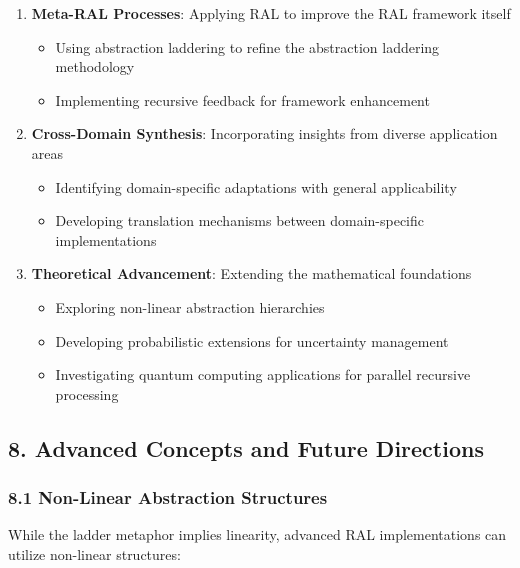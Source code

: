 \documentclass[
]{article}
\providecommand{\tightlist}{%
  \setlength{\itemsep}{0pt}\setlength{\parskip}{0pt}}
\begin{document}
\begin{enumerate}
\def\labelenumi{\arabic{enumi}.}
\tightlist
\item
  \textbf{Meta-RAL Processes}: Applying RAL to improve the RAL framework
  itself

  \begin{itemize}
  \tightlist
  \item
    Using abstraction laddering to refine the abstraction laddering
    methodology
  \item
    Implementing recursive feedback for framework enhancement
  \end{itemize}
\item
  \textbf{Cross-Domain Synthesis}: Incorporating insights from diverse
  application areas

  \begin{itemize}
  \tightlist
  \item
    Identifying domain-specific adaptations with general applicability
  \item
    Developing translation mechanisms between domain-specific
    implementations
  \end{itemize}
\item
  \textbf{Theoretical Advancement}: Extending the mathematical
  foundations

  \begin{itemize}
  \tightlist
  \item
    Exploring non-linear abstraction hierarchies
  \item
    Developing probabilistic extensions for uncertainty management
  \item
    Investigating quantum computing applications for parallel recursive
    processing
  \end{itemize}
\end{enumerate}

\subsection{8. Advanced Concepts and Future
Directions}\label{advanced-concepts-and-future-directions}

\subsubsection{8.1 Non-Linear Abstraction
Structures}\label{non-linear-abstraction-structures}

While the ladder metaphor implies linearity, advanced RAL
implementations can utilize non-linear structures:
\end{document}
